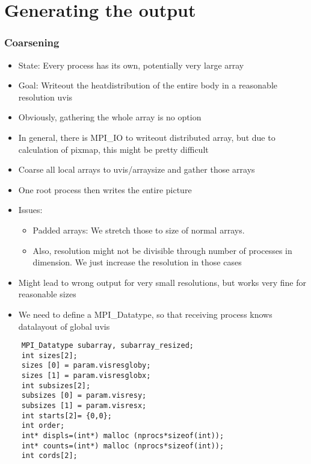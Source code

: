 \section{Generating the output}
\begin{frame}
  \frametitle{Coarsening}
  \begin{itemize}
  \item State: Every process has its own, potentially very large array
  \item Goal: Writeout the heatdistribution of the entire body in a reasonable resolution uvis
  \item Obviously, gathering the whole array is no option
  \item In general, there is MPI\_IO to writeout distributed array, but due to calculation of pixmap, this might be pretty difficult
  \end{itemize}
\end{frame}

\begin{frame}
  \begin{itemize}
  \item Coarse all local arrays to uvis/arraysize and gather those arrays
  \item One root process then writes the entire picture
  \item Issues:
    \begin{itemize}
    \item Padded arrays: We stretch those to size of normal arrays.
    \item Also, resolution might not be divisible through number of processes in dimension. We just increase the resolution in those cases
    \end{itemize}
  \item Might lead to wrong output for very small resolutions, but works very fine for reasonable sizes
  \item We need to define a MPI\_Datatype, so that receiving process knows datalayout of global uvis
  \end{itemize}
\end{frame}

\begin{frame}[fragile]
  \begin{lstlisting}
    MPI_Datatype subarray, subarray_resized;
    int sizes[2];
    sizes [0] = param.visresgloby;
    sizes [1] = param.visresglobx;
    int subsizes[2];
    subsizes [0] = param.visresy;
    subsizes [1] = param.visresx;
    int starts[2]= {0,0};
    int order;
    int* displs=(int*) malloc (nprocs*sizeof(int));
    int* counts=(int*) malloc (nprocs*sizeof(int));
    int cords[2];
  \end{lstlisting}
\end{frame}



